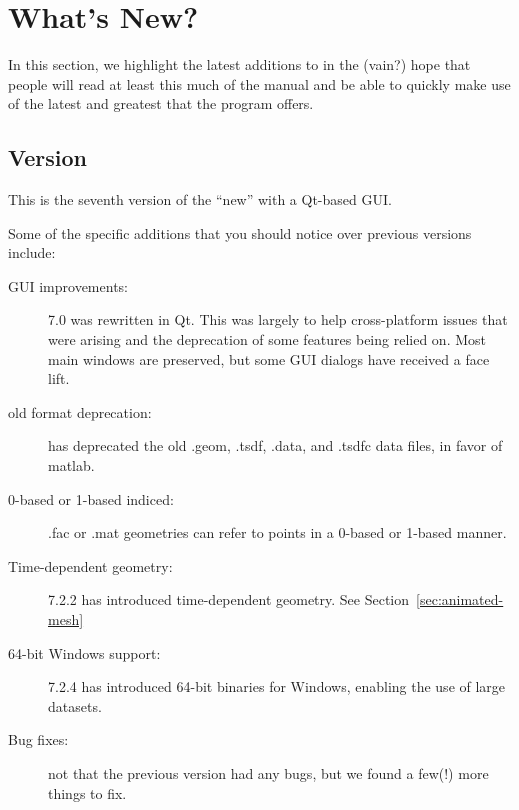 \section{What's New?}
\label{sec:new-features} 

In this section, we highlight the latest additions to \map{} in the
(vain?) hope that people will read at least this much of the manual
and be able to quickly make use of the latest and greatest that the program
offers.

\subsection{Version~\version{}}

This is the seventh version of the ``new'' \map{} with a Qt-based GUI.

Some of the specific additions that you should notice over previous versions
include:
%
\begin{description}
  \item [GUI improvements: ] \map{} 7.0 was rewritten in Qt.
    This was largely to help cross-platform issues that were
    arising and the deprecation of some features being relied
    on.
    Most main windows are preserved, but some GUI dialogs have
    received a face lift.
  \item [old format deprecation: ] \map{} has deprecated the old .geom, .tsdf, .data, and .tsdfc data files, in favor of matlab.
  \item [0-based or 1-based indiced: ] .fac or .mat geometries can refer to points in a 0-based or 1-based manner.
  \item [Time-dependent geometry: ] \map{} 7.2.2 has introduced time-dependent geometry.  See Section~\ref{sec:animated-mesh}
  \item [64-bit Windows support: ] \map{} 7.2.4 has introduced 64-bit binaries for Windows, enabling the use of large datasets.
  \item [Bug fixes: ] not that the previous version had any bugs, but we
    found a few(!) more things to fix.
\end{description}

